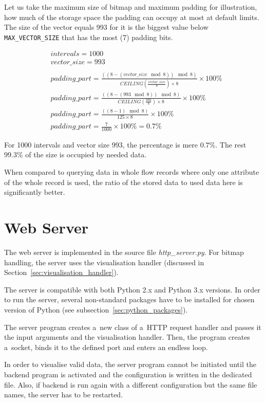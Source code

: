 Let us take the maximum size of bitmap and maximum padding for illustration,
how much of the storage space the padding can occupy at most at default limits.
The size of the vector equals 993 for it is the biggest value below
\texttt{MAX\_VECTOR\_SIZE} that has the most (7) padding bits.

\begin{align*}
   &intervals = 1000 \\
   &vector\_size = 993 \\
   \\
   &padding\_part = \frac{((8 - (vector\_size\mod 8))\mod 8)}{CEILING(\frac{vector\_size}{8}) \times 8} \times 100\% \\
   &padding\_part = \frac{((8 - (993 \mod 8))\mod 8)}{CEILING(\frac{993}{8}) \times 8} \times 100\% \\
   &padding\_part = \frac{((8 - 1)\mod 8)}{125 \times 8} \times 100\% \\
   &padding\_part = \frac{7}{1000} \times 100\% = 0.7\%
\end{align*}

For 1000 intervals and vector size 993, the percentage is mere $0.7\%$. The rest $99.3\%$ of the size is occupied by needed data.

When compared to querying data in whole flow records where only one attribute of the whole record is used,
the ratio of the stored data to used data here is significantly better.




\section{Web Server}
The web server is implemented in the source file \textit{http\_server.py}. For bitmap handling,
the server uses the visualisation handler (discussed in Section~\ref{sec:visualisation_handler}).

The server is compatible with both Python 2.x and Python 3.x versions.
In order to run the server, several non-standard packages have to be installed for chosen
version of Python (see subsection~\ref{sec:python_packages}).

The server program creates a~new class of a~HTTP request handler and passes it the input
arguments and the visualisation handler. Then, the program creates a~socket, binds it
to the defined port and enters an endless loop.

In order to visualise valid data, the server program cannot be initiated
until the backend program is activated and the configuration is written in the
dedicated file. Also, if backend is run again with a different configuration
but the same file names, the server has to be restarted.

